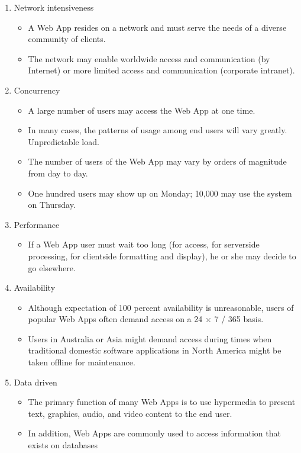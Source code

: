 \documentclass{article}
\begin{document}
	\begin{enumerate}
		\item Network intensiveness
			\begin{itemize}
				\item A Web App resides on a network and must serve the needs of a diverse community of clients.
				\item The network may enable worldwide access and communication (by Internet) or more limited
					access and communication (corporate intranet).
			\end{itemize}
		\item Concurrency
			\begin{itemize}
				\item A large number of users may access the Web App at one time.
				\item In many cases, the patterns of usage among end users will vary greatly.
					Unpredictable load.
				\item The number of users of the Web App may vary by orders of magnitude from day to day.
				\item One hundred users may show up on Monday; 10,000 may use the system on Thursday.
			\end{itemize}
		\item Performance
			\begin{itemize}
				\item If a Web App user must wait too long (for access, for serverside processing, for
					clientside formatting and display), he or she may decide to go elsewhere.
			\end{itemize}
		\item Availability
			\begin{itemize}
				\item Although expectation of 100 percent availability is unreasonable, users of popular Web
					Apps often demand access on a 24 $\times$ 7 / 365 basis.
				\item Users in Australia or Asia might demand access during times when traditional domestic
					software applications in North America might be taken offline for maintenance.
			\end{itemize}
		\item Data driven
			\begin{itemize}
				\item The primary function of many Web Apps is to use hypermedia to present text, graphics,
					audio, and video content to the end user.
				\item In addition, Web Apps are commonly used to access information that exists on databases

\end{itemize}
\end{enumerate}
\end{document}
